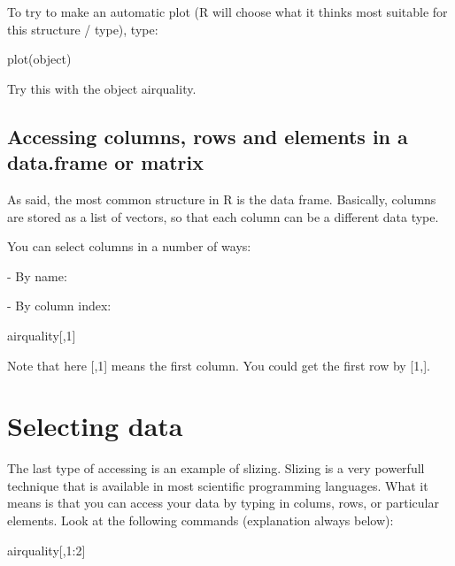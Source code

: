 \documentclass[a4paper,twoside]{tufte-book}\usepackage[]{graphicx}\usepackage[]{color}
\begin{document}
\begin{appendices}
To try to make an automatic plot (R will choose what it thinks most suitable for this structure / type), type:

\begin{Schunk}
\begin{Sinput}
plot(object)
\end{Sinput}
\end{Schunk}

Try this with the object airquality. 

\subsection{Accessing columns, rows and elements in a data.frame or matrix}

As said, the most common structure in R is the data frame. Basically, columns are stored as a list of vectors, so that each column can be a different data type.

You can select columns in a number of ways:

- By name:
\begin{Schunk}
\end{Schunk}

- By column index: 

\begin{Schunk}
\begin{Sinput}
airquality[,1]
\end{Sinput}
\end{Schunk}

Note that here [,1] means the first column. You could get the first row by [1,].

\section{Selecting data}

The last type of accessing is an example of slizing. Slizing is a very powerfull technique that is available in most scientific programming languages. What it means is that you can access your data by typing in colums, rows, or particular elements. Look at the following commands (explanation always below):

\begin{Schunk}
\begin{Sinput}
airquality[,1:2]
\end{Sinput}
\end{Schunk}


\end{appendices}
\end{document}
